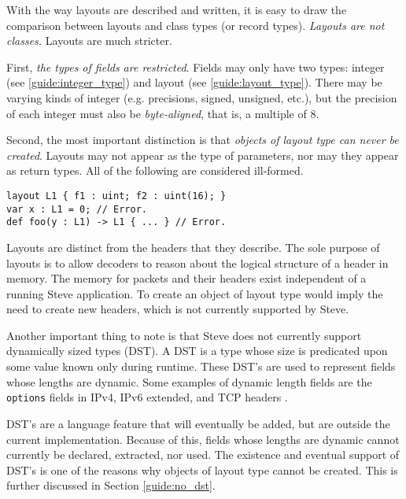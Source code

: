 With the way
layouts are described and written, it is easy to draw the comparison between 
layouts and
class types (or record types). \textit{Layouts are not 
classes.} Layouts are much stricter.

First, \textit{the types of fields are restricted}. Fields may only
have two types: integer (see \ref{guide:integer_type}) and layout
(see \ref{guide:layout_type}). There may be varying kinds of integer (e.g.
precisions, signed, unsigned, etc.), but the precision of each integer must also
be \textit{byte-aligned}, that is, a multiple of 8.

Second, the most important distinction is that \textit{objects of layout type
can never be created}. Layouts may not appear as the type of parameters, nor may
they appear as return types. All of the following are considered ill-formed.

\begin{codepage}
\begin{lstlisting}
layout L1 { f1 : uint; f2 : uint(16); }
var x : L1 = 0; // Error.
def foo(y : L1) -> L1 { ... } // Error.
\end{lstlisting}
\end{codepage}

Layouts are distinct from the headers that they describe.
The sole purpose of layouts is to allow decoders to reason about the logical 
structure of a header in memory.
The memory for packets and their headers exist independent of a running Steve 
application.
To create an object of layout type would imply the need to create new headers,
which is not currently supported by Steve.


Another important thing to note is that Steve does not currently support dynamically
sized types (DST). A DST is a type whose size is predicated upon some value
known only during runtime. These DST's are used to represent fields whose
lengths are dynamic. Some examples of dynamic length fields are the
\texttt{options} fields in IPv4, IPv6 extended, and TCP headers \cite{ipv4_std, ipv6_std,
tcp_std}.

DST's are a language feature that will eventually be added, but are outside the
current implementation. Because of this, fields whose lengths are dynamic cannot
currently be declared, extracted, nor used. The existence and eventual support
of DST's is one of the reasons why objects of layout type cannot be created.
This is further discussed in Section \ref{guide:no_dst}.

